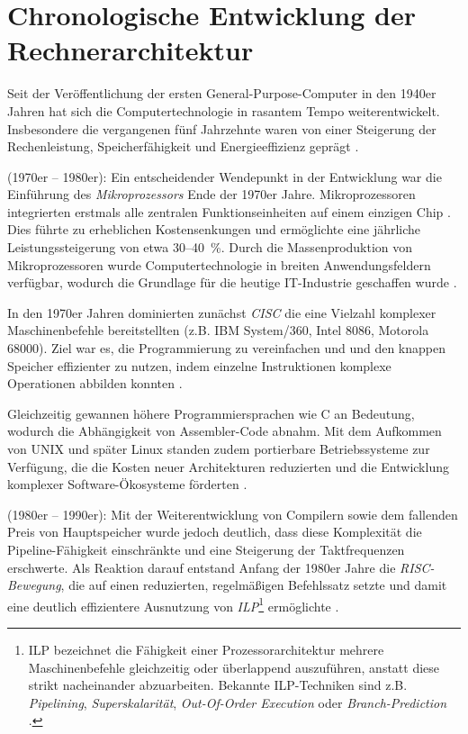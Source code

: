\section{Chronologische Entwicklung der Rechnerarchitektur}\label{chap:3-3-development_ca}

Seit der Veröffentlichung der ersten General-Purpose-Computer in den 1940er Jahren hat sich die Computertechnologie in rasantem Tempo weiterentwickelt. Insbesondere die vergangenen fünf Jahrzehnte waren von einer Steigerung der Rechenleistung, Speicherfähigkeit und Energieeffizienz geprägt \parencite[S.~2]{hennessy_computer_2011}.

(1970er -- 1980er): Ein entscheidender Wendepunkt in der Entwicklung war die Einführung des \textit{Mikroprozessors} Ende der 1970er Jahre. Mikroprozessoren integrierten erstmals alle zentralen Funktionseinheiten auf einem einzigen Chip \parencite[S.~9]{dumas_ii_computer_2006}. Dies führte zu erheblichen Kostensenkungen und ermöglichte eine jährliche Leistungssteigerung von etwa 30--40~\%. Durch die Massenproduktion von Mikroprozessoren wurde Computertechnologie in breiten Anwendungsfeldern verfügbar, wodurch die Grundlage für die heutige IT-Industrie geschaffen wurde \parencites[S.~2]{hennessy_computer_2011}[S.~11]{dumas_ii_computer_2006}.

In den 1970er Jahren dominierten zunächst \textit{\ac{CISC}} die eine Vielzahl komplexer Maschinenbefehle bereitstellten (z.B. IBM System/360, Intel 8086, Motorola 68000). Ziel war es, die Programmierung zu vereinfachen und und den knappen Speicher effizienter zu nutzen, indem einzelne Instruktionen komplexe Operationen abbilden konnten \parencite[S.~12]{dumas_ii_computer_2006}.

Gleichzeitig gewannen höhere Programmiersprachen wie C an Bedeutung, wodurch die Abhängigkeit von Assembler-Code abnahm. Mit dem Aufkommen von UNIX und später Linux standen zudem portierbare Betriebssysteme zur Verfügung, die die Kosten neuer Architekturen reduzierten und die Entwicklung komplexer Software-Ökosysteme förderten \parencites[S.~2]{hennessy_computer_2011}[S.~12]{dumas_ii_computer_2006}.

(1980er -- 1990er): Mit der Weiterentwicklung von Compilern sowie dem fallenden Preis von Hauptspeicher wurde jedoch deutlich, dass diese Komplexität die Pipeline-Fähigkeit einschränkte und eine Steigerung der Taktfrequenzen erschwerte. Als Reaktion darauf entstand Anfang der 1980er Jahre die \textit{\ac{RISC}-Bewegung}, die auf einen reduzierten, regelmäßigen Befehlssatz setzte und damit eine deutlich effizientere Ausnutzung von \textit{\ac{ILP}}\footnote{\acf{ILP} bezeichnet die Fähigkeit einer Prozessorarchitektur mehrere Maschinenbefehle gleichzeitig oder überlappend auszuführen, anstatt diese strikt nacheinander abzuarbeiten. Bekannte ILP-Techniken sind z.B. \textit{Pipelining}, \textit{Superskalarität}, \textit{Out-Of-Order Execution} oder \textit{Branch-Prediction} \cite{rau_instruction-level_2011}.} ermöglichte \parencite[S.~2]{hennessy_computer_2011}.  

